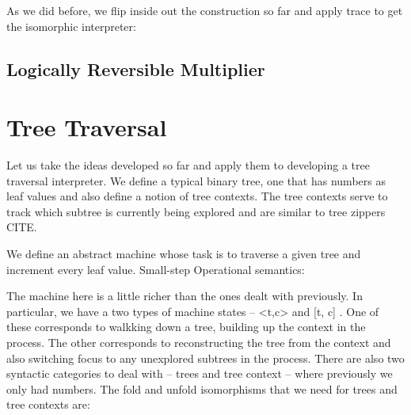 \documentclass{llncs}
\begin{document}
As we did before, we flip inside out the construction so far and
apply {{trace}} to get the isomorphic interpreter:

\begin{center}
\end{center}

\subsection{Logically Reversible Multiplier}


\section{Tree Traversal}

Let us take the ideas developed so far and apply them to developing a
tree traversal interpreter. We define a typical binary tree, one that
has numbers as leaf values and also define a notion of tree
contexts. The tree contexts serve to track which subtree is currently
being explored and are similar to tree zippers CITE.

%

We define an abstract machine whose task is to traverse a given tree
and increment every leaf value. Small-step Operational semantics:


The machine here is a little richer than the ones dealt with
previously. In particular, we have a two types of machine states --
{{<t,c>}} and {{ {[t, c]} }}. One of these corresponds to walkking
down a tree, building up the context in the process. The other
corresponds to reconstructing the tree from the context and also
switching focus to any unexplored subtrees in the process. There are
also two syntactic categories to deal with -- trees and tree context
-- where previously we only had numbers. The {{fold}} and {{unfold}}
isomorphisms that we need for trees and tree contexts are:
\end{document}
